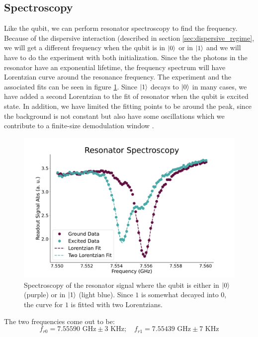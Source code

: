 \subsection{Spectroscopy}
Like the qubit, we can perform resonator spectroscopy to find the frequency. Because of the dispersive interaction (described in section \ref{sec:dispersive_regime}, we will get a different frequency when the qubit is in $\ket{0}$ or in $\ket{1}$ and we will have to do the experiment with both initialization. Since the the photons in the resonator have an exponential lifetime, the frequency spectrum will have Lorentzian curve around the resonance frequency. The experiment and the associated fits can be seen in figure \ref{fig:spectroscopy_resonator}. Since $\ket{1}$ decays to $\ket{0}$ in many cases, we have added a second Lorentzian to the fit of resonator when the qubit is excited state. In addition, we have limited the fitting points to be around the peak, since the background is not constant but also have some oscillations which we contribute to a finite-size demodulation window \cite{resonator_spectroscopy}.
\begin{figure}
    \centering
    \includegraphics{Calibrations/Figures/Resonator Spectroscopy.pdf}
    \caption{Spectroscopy of the resonator signal where the qubit is either in $\ket{0}$ (purple) or in $\ket{1}$ (light blue). Since $1$ is somewhat decayed into $0$, the curve for $1$ is fitted with two Lorentzians.}
    \label{fig:spectroscopy_resonator}
\end{figure}
The two frequencies come out to be:
\begin{equation}
     f_{r0} = 7.55590 \text{ GHz} \pm 3 \text{ KHz} ;\quad f_{r1} =  7.55439 \text{ GHz} \pm 7 \text{ KHz}
\end{equation}
